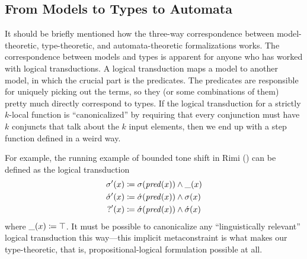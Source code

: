 \documentclass[11pt]{article}
\theoremstyle{definition}
\theoremstyle{plain}
\newcommand{\coloneq}{\mathrel{\vcentcolon\mkern-1.2mu=}}
\newcommand{\hole}{\_}
\begin{document}
\subsection{From Models to Types to Automata}
It should be briefly mentioned how the three-way correspondence
between model-theoretic, type-theoretic, and automata-theoretic
formalizations works.  The correspondence between models and types is
apparent for anyone who has worked with logical transductions.  A
logical transduction maps a model to another model, in which the
crucial part is the predicates.  The predicates are responsible for
uniquely picking out the terms, so they (or some combinations of them)
pretty much directly correspond to types.  If the logical transduction
for a strictly \(k\)-local function is \enquote{canonicalized} by
requiring that every conjunction must have \(k\) conjuncts that talk
about the \(k\) input elements, then we end up with a step function
defined in a weird way.

For example, the running example of bounded tone shift in Rimi
() can be defined as the logical transduction
%
\begin{align*}
  \sigma'(x)
    & \coloneq \sigma(\mathit{pred}(x)) \land \hole(x) \\
  \acute{\sigma}'(x)
    & \coloneq \acute{\sigma}(\mathit{pred}(x)) \land \sigma(x) \\
  {?}'(x)
    & \coloneq \acute{\sigma}(\mathit{pred}(x)) \land
        \acute{\sigma}(x)
\end{align*}
%
where \(\hole(x) \coloneq \top\).  It must be possible to canonicalize
any \enquote{linguistically relevant} logical transduction this
way---this implicit metaconstraint is what makes our type-theoretic,
that is, propositional-logical formulation possible at all.
\end{document}
